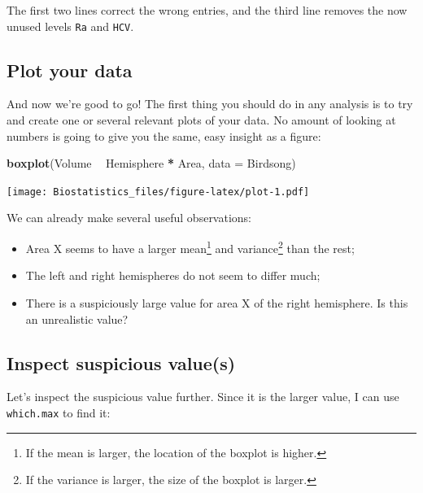 \documentclass[
]{book}
\newenvironment{Shaded}{\begin{snugshade}}{\end{snugshade}}
\newcommand{\DataTypeTok}[1]{\textcolor[rgb]{0.13,0.29,0.53}{#1}}
\newcommand{\KeywordTok}[1]{\textcolor[rgb]{0.13,0.29,0.53}{\textbf{#1}}}
\newcommand{\NormalTok}[1]{#1}
\newcommand{\OperatorTok}[1]{\textcolor[rgb]{0.81,0.36,0.00}{\textbf{#1}}}
\newcommand{\StringTok}[1]{\textcolor[rgb]{0.31,0.60,0.02}{#1}}
\providecommand{\tightlist}{%
  \setlength{\itemsep}{0pt}\setlength{\parskip}{0pt}}
\begin{document}
The first two lines correct the wrong entries, and the third line removes the now unused levels \texttt{Ra} and \texttt{HCV}.

\hypertarget{plot-your-data}{%
\subsection{Plot your data}\label{plot-your-data}}

And now we're good to go! The first thing you should do in any analysis is to try and create one or several relevant plots of your data. No amount of looking at numbers is going to give you the same, easy insight as a figure:

\begin{Shaded}
\begin{Highlighting}[]
\KeywordTok{boxplot}\NormalTok{(Volume }\OperatorTok{~}\StringTok{ }\NormalTok{Hemisphere }\OperatorTok{*}\StringTok{ }\NormalTok{Area, }\DataTypeTok{data =}\NormalTok{ Birdsong)}
\end{Highlighting}
\end{Shaded}

\texttt{[image: Biostatistics\_files/figure-latex/plot-1.pdf]}

We can already make several useful observations:

\begin{itemize}
\tightlist
\item
  Area X seems to have a larger mean\footnote{If the mean is larger, the location of the boxplot is higher.} and variance\footnote{If the variance is larger, the size of the boxplot is larger.} than the rest;
\item
  The left and right hemispheres do not seem to differ much;
\item
  There is a suspiciously large value for area X of the right hemisphere. Is this an unrealistic value?
\end{itemize}

\hypertarget{inspect-suspicious-values}{%
\subsection{Inspect suspicious value(s)}\label{inspect-suspicious-values}}

Let's inspect the suspicious value further. Since it is the larger value, I can use \texttt{which.max} to find it:

\begin{Shaded}
\end{Shaded}
\end{document}

